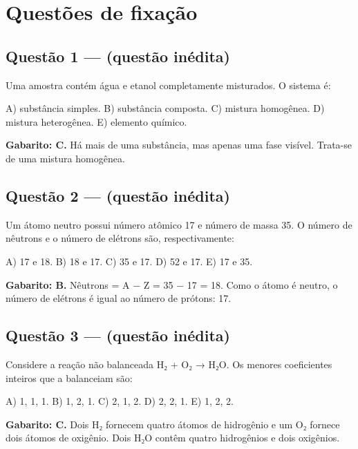 \documentclass[11pt,a4paper]{article}
\begin{document}
\section*{Questões de fixação}

\subsection*{Questão 1 — (questão inédita)}

Uma amostra contém água e etanol completamente misturados. O sistema é:

A) substância simples. B) substância composta. C) mistura homogênea. D) mistura heterogênea. E) elemento químico.

\begin{alerta}
\textbf{Gabarito: C.} Há mais de uma substância, mas apenas uma fase visível. Trata-se de uma mistura homogênea.
\end{alerta}

\subsection*{Questão 2 — (questão inédita)}

Um átomo neutro possui número atômico 17 e número de massa 35. O número de nêutrons e o número de elétrons são, respectivamente:

A) 17 e 18. B) 18 e 17. C) 35 e 17. D) 52 e 17. E) 17 e 35.

\begin{alerta}
\textbf{Gabarito: B.} Nêutrons = A − Z = 35 − 17 = 18. Como o átomo é neutro, o número de elétrons é igual ao número de prótons: 17.
\end{alerta}

\subsection*{Questão 3 — (questão inédita)}

Considere a reação não balanceada H₂ + O₂ → H₂O. Os menores coeficientes inteiros que a balanceiam são:

A) 1, 1, 1. B) 1, 2, 1. C) 2, 1, 2. D) 2, 2, 1. E) 1, 2, 2.

\begin{alerta}
\textbf{Gabarito: C.} Dois H₂ fornecem quatro átomos de hidrogênio e um O₂ fornece dois átomos de oxigênio. Dois H₂O contêm quatro hidrogênios e dois oxigênios.
\end{alerta}
\end{document}
